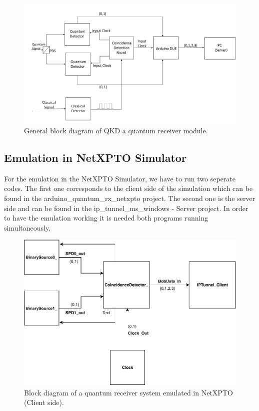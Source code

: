 \begin{refsection}
	\begin{figure}[H]
		\centering
		\includegraphics[width=0.9\linewidth]{./sdf/arduino_quantum_rx/figures/DiagramaGeral.pdf}
		\caption{General block diagram of QKD a quantum receiver module.}
		\label{fig:arduino}
	\end{figure}


		
	\subsection{Emulation in NetXPTO Simulator}
	
	For the emulation in the NetXPTO Simulator, we have to run two seperate codes. The first one corresponds to the client side of the simulation which can be found in the arduino\_quantum\_rx\_netxpto project. The second one is the server side and can be found in the ip\_tunnel\_ms\_windows - Server project. In order to have the emulation working it is needed both programs running simultaneously.
	
	\begin{figure}[H]
		\centering
		\includegraphics[width=0.9\linewidth]{./sdf/arduino_quantum_rx/figures/NetXPTO_implementation.pdf}
		\caption{Block diagram of a quantum receiver system emulated in NetXPTO (Client side).}
		\label{fig:netxpto}
	\end{figure}


\end{refsection}
